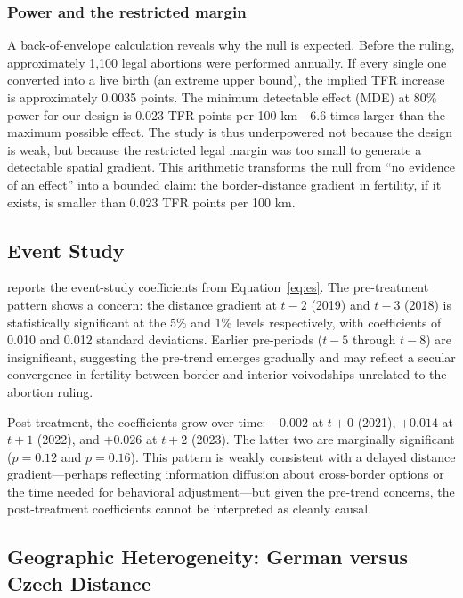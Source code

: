 \documentclass[12pt]{article}
\begin{document}
\subsubsection*{Power and the restricted margin} A back-of-envelope calculation reveals why the null is expected. Before the ruling, approximately 1,100 legal abortions were performed annually. If every single one converted into a live birth (an extreme upper bound), the implied TFR increase is approximately 0.0035 points. The minimum detectable effect (MDE) at 80\% power for our design is 0.023 TFR points per 100 km---6.6 times larger than the maximum possible effect. The study is thus underpowered not because the design is weak, but because the restricted legal margin was too small to generate a detectable spatial gradient. This arithmetic transforms the null from ``no evidence of an effect'' into a bounded claim: the border-distance gradient in fertility, if it exists, is smaller than 0.023 TFR points per 100 km.



\subsection{Event Study}

 reports the event-study coefficients from Equation~\ref{eq:es}. The pre-treatment pattern shows a concern: the distance gradient at $t-2$ (2019) and $t-3$ (2018) is statistically significant at the 5\% and 1\% levels respectively, with coefficients of 0.010 and 0.012 standard deviations. Earlier pre-periods ($t-5$ through $t-8$) are insignificant, suggesting the pre-trend emerges gradually and may reflect a secular convergence in fertility between border and interior voivodships unrelated to the abortion ruling.

Post-treatment, the coefficients grow over time: $-0.002$ at $t+0$ (2021), $+0.014$ at $t+1$ (2022), and $+0.026$ at $t+2$ (2023). The latter two are marginally significant ($p = 0.12$ and $p = 0.16$). This pattern is weakly consistent with a delayed distance gradient---perhaps reflecting information diffusion about cross-border options or the time needed for behavioral adjustment---but given the pre-trend concerns, the post-treatment coefficients cannot be interpreted as cleanly causal.



\subsection{Geographic Heterogeneity: German versus Czech Distance}
\end{document}
